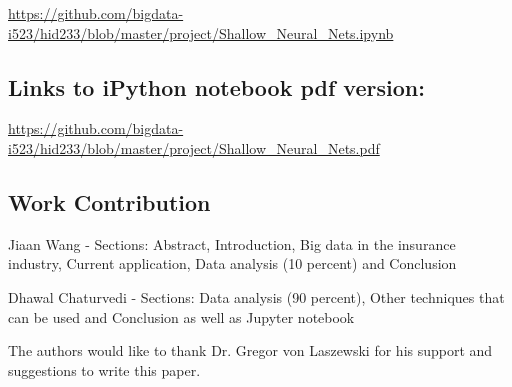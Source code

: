 \url{https://github.com/bigdata-i523/hid233/blob/master/project/Shallow_Neural_Nets.ipynb}

\subsection{Links to iPython notebook pdf version:}
\url{https://github.com/bigdata-i523/hid233/blob/master/project/Shallow_Neural_Nets.pdf}

\subsection{Work Contribution}

Jiaan Wang - Sections: Abstract, Introduction, Big data in the insurance industry, Current application, Data analysis (10 percent) and Conclusion

Dhawal Chaturvedi - Sections: Data analysis (90 percent), Other techniques that can be used and Conclusion as well as Jupyter notebook


\begin{acks}

  The authors would like to thank Dr. Gregor von Laszewski for his
  support and suggestions to write this paper.

\end{acks}


 


